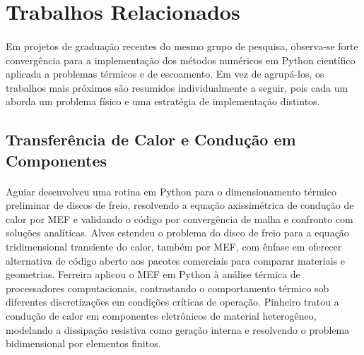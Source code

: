 \section{Trabalhos Relacionados}
\label{sec:trabalhos_relacionados}

\paragraph{}Em projetos de graduação recentes do mesmo grupo de pesquisa, observa-se forte convergência para a implementação dos métodos numéricos em Python científico aplicada a problemas térmicos e de escoamento. Em vez de agrupá-los, os trabalhos mais próximos são resumidos individualmente a seguir, pois cada um aborda um problema físico e uma estratégia de implementação distintos.

\subsection{Transferência de Calor e Condução em Componentes}

\paragraph{}Aguiar \cite{Aguiar2020} desenvolveu uma rotina em Python para o dimensionamento térmico preliminar de discos de freio, resolvendo a equação axissimétrica de condução de calor por MEF e validando o código por convergência de malha e confronto com soluções analíticas. Alves \cite{Alves2021} estendeu o problema do disco de freio para a equação tridimensional transiente do calor, também por MEF, com ênfase em oferecer alternativa de código aberto aos pacotes comerciais para comparar materiais e geometrias. Ferreira \cite{Ferreira2022} aplicou o MEF em Python à análise térmica de processadores computacionais, contrastando o comportamento térmico sob diferentes discretizações em condições críticas de operação. Pinheiro \cite{Pinheiro2022} tratou a condução de calor em componentes eletrônicos de material heterogêneo, modelando a dissipação resistiva como geração interna e resolvendo o problema bidimensional por elementos finitos.


